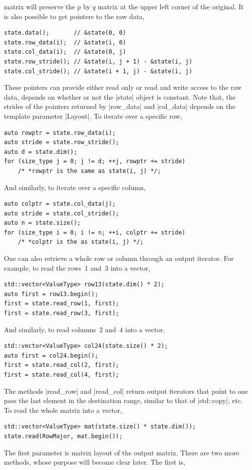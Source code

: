 matrix will preserve the $p$ by $q$ matrix at the upper left corner of the
original. It is also possible to get pointers to the raw data,
\begin{Verbatim}
state.data();       // &state(0, 0)
state.row_data(i);  // &state(i, 0)
state.col_data(i);  // &state(0, j)
state.row_stride(); // &state(i, j + 1) - &state(i, j)
state.col_stride(); // &state(i + 1, j) - &state(i, j)
\end{Verbatim}
These pointers can provide either read only or read and write access to the raw
data, depends on whether or not the |state| object is constant. Note that, the
strides of the pointers returned by |row_data| and |col_data| depends on the
template parameter |Layout|. To iterate over a specific row,
\begin{Verbatim}
auto rowptr = state.row_data(i);
auto stride = state.row_stride();
auto d = state.dim();
for (size_type j = 0; j != d; ++j, rowptr += stride)
    /* *rowptr is the same as state(i, j) */;
\end{Verbatim}
And similarly, to iterate over a specific column,
\begin{Verbatim}
auto colptr = state.col_data(j);
auto stride = state.col_stride();
auto n = state.size();
for (size_type i = 0; i != n; ++i, colptr += stride)
    /* *colptr is the as state(i, j) */;
\end{Verbatim}
One can also retrieve a whole row or column through an output iterator. For
example, to read the rows~1 and~3 into a vector,
\begin{Verbatim}
std::vector<ValueType> row13(state.dim() * 2);
auto first = row13.begin();
first = state.read_row(1, first);
first = state.read_row(3, first);
\end{Verbatim}
And similarly, to read columns~2 and~4 into a vector,
\begin{Verbatim}
std::vector<ValueType> col24(state.size() * 2);
auto first = col24.begin();
first = state.read_col(2, first);
first = state.read_col(4, first);
\end{Verbatim}
The methods |read_row| and |read_col| return output iterators that point to one
pass the last element in the destination range, similar to that of |std::copy|,
etc. To read the whole matrix into a vector,
\begin{Verbatim}
std::vector<ValueType> mat(state.size() * state.dim());
state.read(RowMajor, mat.begin());
\end{Verbatim}
The first parameter is matrix layout of the output matrix. There are two more
methods, whose purpose will become clear later. The first is,
